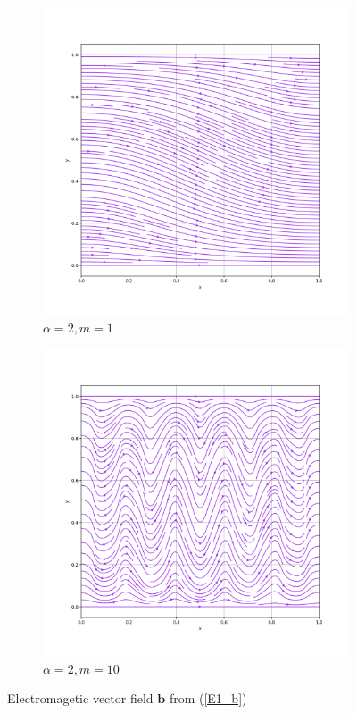 \documentclass[12pt]{ociamthesis}
\begin{document}
\begin{figure}[H]
 \begin{subfigure}{0.5\textwidth}
     \includegraphics[width=\textwidth]{Pics/VectorField/E1b_a2_m1.png}
     \caption{$\alpha=2, m=1$}
 \end{subfigure}
   \begin{subfigure}{0.5\textwidth}
     \includegraphics[width=\textwidth]{Pics/VectorField/E1b_a2_m10.png}
     \caption{$\alpha=2, m=10$}
 \end{subfigure}
 \caption{Electromagetic vector field $\mathbf{b}$ from (\ref{E1_b})} \label{E1_VFs}
\end{figure}
\end{document}

